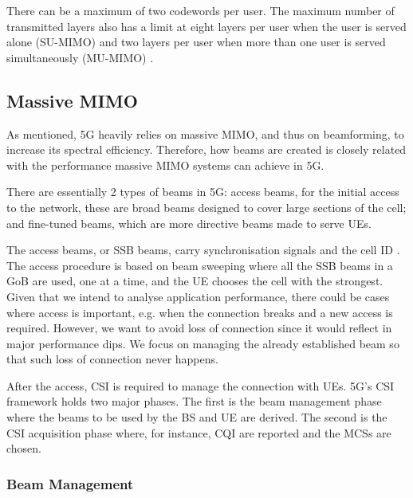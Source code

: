 

There can be a maximum of two codewords per user. The maximum number of transmitted layers also has a limit at eight layers per user when the user is served alone (SU-MIMO) and two layers per user when more than one user is served simultaneously (MU-MIMO) \cite{3gpp-codebooks}.



\subsection*{Massive MIMO}

As mentioned, 5G heavily relies on massive MIMO, and thus on beamforming, to increase its spectral efficiency. Therefore, how beams are created is closely related with the performance massive MIMO systems can achieve in 5G.

There are essentially 2 types of beams in 5G: access beams, for the initial access to the network, these are broad beams designed to cover large sections of the cell; and fine-tuned beams, which are more directive beams made to serve \acsp{UE}.

The access beams, or \ac{SSB} beams, carry synchronisation signals and the cell \acs{ID} \cite{8407094}. The access procedure is based on beam sweeping where all the SSB beams in a \ac{GoB} are used, one at a time, and the UE chooses the cell with the strongest. Given that we intend to analyse application performance, there could be cases where access is important, e.g. when the connection breaks and a new access is required. However, we want to avoid loss of connection since it would reflect in major performance dips. We focus on managing the already established beam so that such loss of connection never happens.

After the access, \ac{CSI} is required to manage the connection with UEs. 5G's \ac{CSI} framework holds two major phases. The first is the beam management phase where the beams to be used by the \ac{BS} and \ac{UE} are derived. The second is the CSI acquisition phase where, for instance, \acs{CQI} are reported and the \acsp{MCS} are chosen. 

\subsubsection*{Beam Management}


